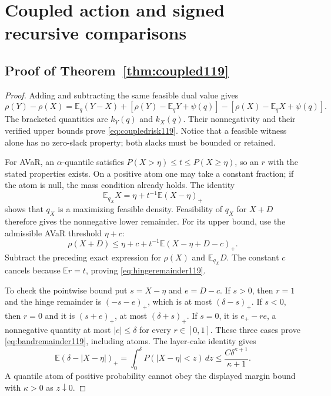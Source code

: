 \section{Coupled action and signed recursive comparisons}
\label{supp:coupled119}
\subsection{Proof of Theorem~\ref{thm:coupled119}}
\begin{proof}
Adding and subtracting the same feasible dual value gives
\[
 \rho(Y)-\rho(X)
 =\mathbb E_q(Y-X)+
   [\rho(Y)-\mathbb E_qY+\psi(q)]-
   [\rho(X)-\mathbb E_qX+\psi(q)].
\]
The bracketed quantities are $k_Y(q)$ and $k_X(q)$.
Their nonnegativity and their verified upper bounds prove
\eqref{eq:coupledrisk119}.  Notice that a feasible witness alone
has no zero-slack property; both slacks must be bounded or retained.

For AVaR, an $\alpha$-quantile satisfies
$P(X>\eta)\le t\le P(X\ge\eta)$, so an $r$ with the stated
properties exists.  On a positive atom one may take a constant
fraction; if the atom is null, the mass condition already holds.
The identity
\[
 \mathbb E_{q_X}X
 =\eta+t^{-1}\mathbb E(X-\eta)_+
\]
shows that $q_X$ is a maximizing feasible density.  Feasibility of
$q_X$ for $X+D$ therefore gives the nonnegative lower remainder.
For its upper bound, use the admissible AVaR threshold $\eta+c$:
\[
 \rho(X+D)\le\eta+c+
             t^{-1}\mathbb E(X-\eta+D-c)_+.
\]
Subtract the preceding exact expression for $\rho(X)$ and
$\mathbb E_{q_X}D$.  The constant $c$ cancels because
$\mathbb Er=t$, proving \eqref{eq:hingeremainder119}.

To check the pointwise bound put $s=X-\eta$ and $e=D-c$.
If $s>0$, then $r=1$ and the hinge remainder is
$(-s-e)_+$, which is at most $(\delta-s)_+$.
If $s<0$, then $r=0$ and it is $(s+e)_+$, at most
$(\delta+s)_+$.  If $s=0$, it is $e_+-re$, a nonnegative
quantity at most $|e|\le\delta$ for every $r\in[0,1]$.
These three cases prove \eqref{eq:bandremainder119}, including
atoms.  The layer-cake identity gives
\[
 \mathbb E(\delta-|X-\eta|)_+
 =\int_0^\delta P(|X-\eta|<z)\,dz
 \le\frac{C\delta^{\kappa+1}}{\kappa+1}.
\]
A quantile atom of positive probability cannot obey the displayed
margin bound with $\kappa>0$ as $z\downarrow0$.


\end{proof}
